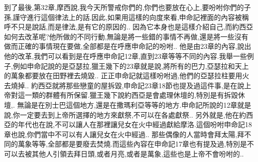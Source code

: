 \documentclass{book}
\begin{document}
到了最後,第32章,摩西說,我今天所警戒你們的,你們也要放在心上,要吩咐你們的子孫,謹守進行這個律法上的話.因此,如果用這樣的向度來看,申命記裡面的內容被稱呼不只是說話,而是律法,是有它的原因的..
因為它本身也是這樣介紹自己,而約西亞如何去改革呢?他所做的不同行動,無論是將一些錯的事情不再做,還是將一些沒有做而正確的事情現在要做,全部都是在呼應申命記的吩咐..
他是由23章的內容,說出他的改革,我們可以看到是在呼應申命記12章,直到23章等等不同的內容.我舉一些例子,例如申命記說的是亞瑟拉,獵王幾下的23章就是說,將所有的巴力,亞瑟拉和天上的萬象都要放在田野裡去燒毀..
正正申命記就這樣吩咐過,他們的亞瑟拉柱要用火去燒掉..
約西亞就將那些戀童的屋拆毀,申命記23章18節也提及過這件事,是在說上帝對這一類的群體有所保留.獵王幾下說約西亞是會處理休壇的,特別是有拆毀休壇,.
無論是在別士巴這個地方,還是在撒瑪利亞等等的地方.申命記所說的12章就是說,你一定要去到上帝所選擇的地方來獻祭,不可以在各處獻祭..
另外就是,他在約西亞的年代也在說,不可以讓人在那裡讓兒女在火中經過獻給摩洛.這個吩咐申命記18章也說,你們當中不可以有人讓兒女在火中經過..
那些偶像的人當時會拜太陽,拜不同的萬象等等,全部都是要廢去焚燒.而這些內容在申命記17章也有提及過,特別是不可以去被其他人引領去拜日頭,或者月亮,或者是萬象,這些也是上帝不會吩咐的..
\end{document}
